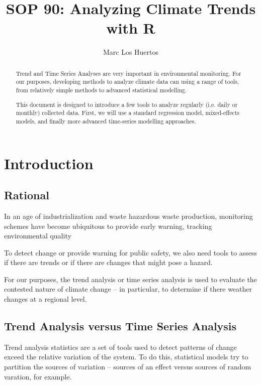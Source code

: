 \documentclass{article}\usepackage[]{graphicx}\usepackage[]{color}
\title{SOP 90: Analyzing Climate Trends with R}
\author{Marc Los Huertos}
\begin{document}
\maketitle
\tableofcontents

\begin{abstract}
\noindent Trend and Time Series Analyses are very important in environmental monitoring. For our purposes, developing methods to analyze climate data can using a range of tools, from relatively simple methods to advanced statistical modelling. 

This document is designed to introduce a few tools to analyze regularly (i.e. daily or monthly) collected data. First, we will use a standard regression model, mixed-effects models, and finally more advanced time-series modelling approaches.   

\end{abstract}


\section{Introduction}

\subsection{Rational}

In an age of industrialization and waste hazardous waste production, monitoring schemes have become ubiquitous to provide early warning, tracking environmental quality 

To detect change or provide warning for public safety, we also need tools to assess if there are trends or if there are changes that might pose a hazard.

For our purposes, the trend analysis or time series analysis is used to evaluate the contested nature of climate change -- in particular, to determine if there weather changes at a regional level. 

\subsection{Trend Analysis versus Time Series Analysis}

Trend analysis statistics are a set of tools used to detect patterns of change exceed the relative variation of the system. To do this, statistical models try to partition the sources of variation -- sources of an effect versus sources of random varation, for example.
\end{document}

